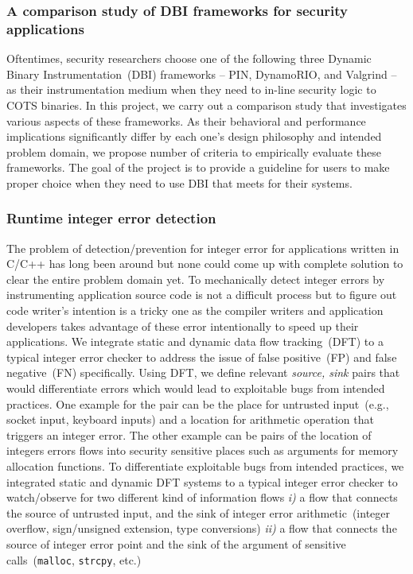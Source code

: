 \documentclass[letterpaper, 10pt]{article}
\begin{document}
\begin{small}
\subsubsection*{A comparison study of DBI frameworks for security applications}
%
Oftentimes, security researchers choose one of the following three Dynamic
Binary Instrumentation~(DBI) frameworks -- PIN, DynamoRIO, and Valgrind -- as
their instrumentation medium when they need to in-line security logic to COTS
binaries.
%
In this project, we carry out a comparison study that investigates various
aspects of these  frameworks. As their behavioral and performance implications
significantly differ by each one's design philosophy and intended problem
domain, we propose number of criteria  to empirically evaluate these frameworks.
%
The goal of the project is to provide a guideline for users to make proper
choice when they need to use DBI that meets for their systems.

\subsubsection*{Runtime integer error detection}

The problem of detection/prevention for integer error for applications written
in C/C++ has long been around but none could come up with complete solution to
clear the entire problem domain yet. 
%
To mechanically detect integer errors by instrumenting application source code
is not a difficult process but to figure out code writer's intention is a
tricky one as the compiler writers and application developers takes advantage
of these error intentionally to speed up their applications.
%
We integrate static and dynamic data flow tracking~(DFT) to a typical integer
error checker to address the issue of false positive~(FP) and false
negative~(FN) specifically. Using DFT, we define relevant {\it source, sink}
pairs that would differentiate errors which would lead to exploitable bugs from
intended practices. One example for the pair can be the place for untrusted
input~(e.g., socket input, keyboard inputs) and a location for arithmetic
operation that triggers an integer error. The other example can be pairs of the
location of integers errors flows into security sensitive places such as
arguments for memory allocation functions.
%
To differentiate exploitable bugs from intended practices, we integrated static
and dynamic DFT systems to a typical integer error checker to watch/observe for
two different kind of information flows {\it i)} a flow that connects the
source of untrusted input, and the sink of integer error arithmetic~(integer
overflow, sign/unsigned extension, type conversions) {\it ii)} a flow that
connects the source of integer error point and the sink of the argument of
sensitive calls~({\tt malloc}, {\tt strcpy}, etc.)


\end{small}
\end{document}
